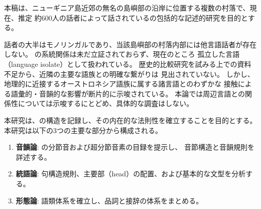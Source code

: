 \label{sec:introduction}

本稿は、ニューギニア島近郊の無名の島嶼部の沿岸に位置する複数の村落で、現在、推定
約600人の話者によって話されている\langname の包括的な記述的研究を目的とする。

\langname 話者の大半はモノリンガルであり、当該島嶼部の村落内部には他言語話者が存在しない。
\langname の系統関係は未だ立証されておらず、現在のところ
孤立した言語（language isolate）として扱われている。
歴史的比較研究を試みる上での資料不足から、近隣の主要な語族との明確な繋がりは
見出されていない。
しかし、地理的に近接するオーストロネシア語族に属する諸言語とのわずかな
接触による語彙的・音韻的な影響が断片的に示唆されている。
本論では周辺言語との関係性については示唆するにとどめ、具体的な調査はしない。

本研究は、\langname の構造を記録し、その内在的な法則性を確立することを目的とする。
本研究は以下の3つの主要な部分から構成される。

\begin{enumerate}
    \item \textbf{音韻論}: \langname の分節音および超分節音素の目録を提示し、
    音節構造と音韻規則を詳述する。
    \item \textbf{統語論}: 句構造規則、主要部（head）の配置、および基本的な文型を分析する。
    \item \textbf{形態論}: 語類体系を確立し、品詞と接辞の体系をまとめる。
\end{enumerate}


